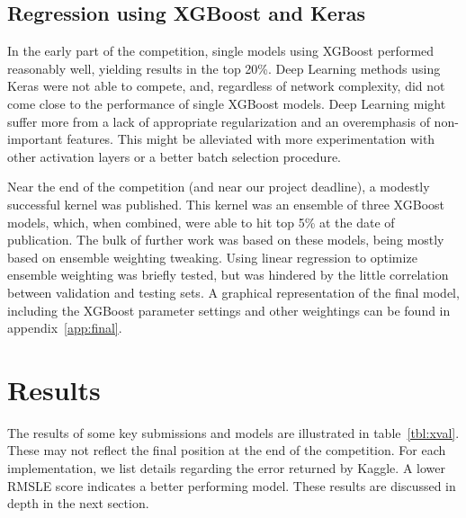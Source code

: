 \documentclass[a4paper,11pt,twocolumn]{article}
\begin{document}
\subsection{Regression using XGBoost and Keras}
In the early part of the competition, single models using XGBoost performed
reasonably well, yielding results in the top 20\%. Deep Learning methods using
Keras were not able to compete, and, regardless of network complexity, did not
come close to the performance of single XGBoost models. Deep Learning might
suffer more from a lack of appropriate regularization and an overemphasis of
non-important features. This might be alleviated with more experimentation with
other activation layers or a better batch selection procedure.

Near the end of the competition (and near our project deadline), a modestly
successful kernel was published. This kernel was an ensemble of three XGBoost
models, which, when combined, were able to hit top 5\% at the date of
publication. The bulk of further work was based on these models, being mostly
based on ensemble weighting tweaking. Using linear regression to optimize
ensemble weighting was briefly tested, but was hindered by the little
correlation between validation and testing sets. A graphical representation of
the final model, including the XGBoost parameter settings and other weightings
can be found in appendix~\ref{app:final}.

\section{Results}
The results of some key submissions and models are illustrated in
table~\ref{tbl:xval}. These may not reflect the final position at the end of the
competition. For each implementation, we list details regarding the error
returned by Kaggle. A lower RMSLE score indicates a better performing model. These
results are discussed in depth in the next section.
\end{document}
